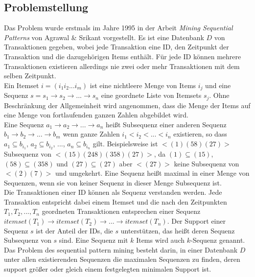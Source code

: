 \subsection{Problemstellung}
Das Problem wurde erstmals im Jahre 1995 in der Arbeit \textit{Mining Sequential Patterns} \cite{aprioriall} von Agrawal \& Srikant vorgestellt. Es ist eine Datenbank $D$ von Transaktionen gegeben, wobei jede Transaktion eine ID, den Zeitpunkt der Transaktion und die dazugehörigen Items enthält. Für jede ID können mehrere Transaktionen existieren allerdings nie zwei oder mehr Transaktionen mit dem selben Zeitpunkt.\\
Ein Itemset $i=(i_1i_2...i_m)$ ist eine nichtleere Menge von Items $i_j$ und eine Sequenz $s=s_1\rightarrow s_2\rightarrow ...\rightarrow s_n$ eine geordnete Liste von Itemsets $s_j$. Ohne Beschränkung der Allgemeinheit wird angenommen, dass die Menge der Items auf eine Menge von fortlaufenden ganzen Zahlen abgebildet wird.\\
Eine Sequenz $a_1\rightarrow a_2\rightarrow ...\rightarrow a_n$ heißt Subsequenz einer anderen Sequenz $b_1\rightarrow b_2\rightarrow ...\rightarrow b_m$ wenn ganze Zahlen $i_1<i_2<...<i_n$ existieren, so dass $a_1\subseteq b_{i_1}$, $a_2\subseteq b_{i_2}$, ..., $a_n\subseteq b_{i_n}$ gilt. Beispielsweise ist $<(1)(58)(27)>$ Subsequenz von $<(15)(248)(358)(27)>$, da $(1)\subseteq(15)$, $(58)\subseteq(358)$ und $(27)\subseteq(27)$ aber $<(27)>$ keine Subsequenz von $<(2)(7)>$ und umgekehrt. Eine Sequenz heißt maximal in einer Menge von Sequenzen, wenn sie von keiner Sequenz in dieser Menge Subsequenz ist.\\
Die Transaktionen einer ID können als Sequenz verstanden werden. Jede Transaktion entspricht dabei einem Itemset und die nach den Zeitpunkten $T_1,T_2,...,T_n$ geordneten Transaktionen entsprechen einer Sequenz $itemset(T_1)\rightarrow itemset(T_2)\rightarrow ...\rightarrow itemset(T_n)$. Der Support einer Sequenz $s$ ist der Anteil der IDs, die $s$ unterstützen, das heißt deren Sequenz Subsequenz von $s$ sind. Eine Sequenz mit $k$ Items wird auch $k$-Sequenz genannt.\\
Das Problem des sequential pattern mining besteht darin, in einer Datenbank $D$ unter allen existierenden Sequenzen die maximalen Sequenzen zu finden, deren support größer oder gleich einem festgelegten minimalen Support ist.

